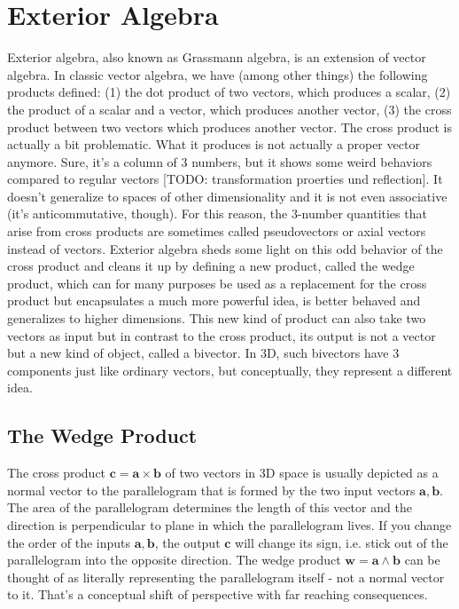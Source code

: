 \section{Exterior Algebra}
Exterior algebra, also known as Grassmann algebra, is an extension of vector algebra. In classic vector algebra, we have (among other things) the following products defined: (1) the dot product of two vectors, which produces a scalar, (2) the product of a scalar and a vector, which produces another vector, (3) the cross product between two vectors which produces another vector. The cross product is actually a bit problematic. What it produces is not actually a proper vector anymore. Sure, it's a column of 3 numbers, but it shows some weird behaviors compared to regular vectors [TODO: transformation proerties und reflection]. It doesn't generalize to spaces of other dimensionality and it is not even associative (it's anticommutative, though). For this reason, the 3-number quantities that arise from cross products are sometimes called pseudovectors or axial vectors instead of vectors. Exterior algebra sheds some light on this odd behavior of the cross product and cleans it up by defining a new product, called the wedge product, which can for many purposes be used as a replacement for the cross product but encapsulates a much more powerful idea, is better behaved and generalizes to higher dimensions. This new kind of product can also take two vectors as input but in contrast to the cross product, its output is not a vector but a new kind of object, called a bivector. In 3D, such bivectors have 3 components just like ordinary vectors, but conceptually, they represent a different idea. 

\subsection{The Wedge Product}
The cross product $\mathbf{c = a \times b}$ of two vectors in 3D space is usually depicted as a normal vector to the parallelogram that is formed by the two input vectors $\mathbf{a,b}$. The area of the parallelogram determines the length of this vector and the direction is perpendicular to plane in which the parallelogram lives. If you change the order of the inputs $\mathbf{a,b}$, the output  $\mathbf{c}$ will change its sign, i.e. stick out of the parallelogram into the opposite direction. The wedge product $\mathbf{w = a \wedge b}$ can be thought of as literally representing the parallelogram itself - not a normal vector to it. That's a conceptual shift of perspective with far reaching consequences. 

